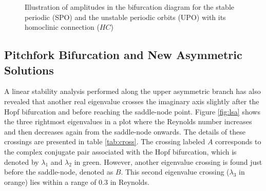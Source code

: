 \begin{figure}[h!]
\centering
{}
\caption{Illustration of amplitudes in the bifurcation diagram for the stable
  periodic (SPO) and the unstable periodic orbits (UPO) with its homoclinic
  connection ($HC$)} 
\label{fig:sub_hopf_sketch}
\end{figure}

\subsection{Pitchfork Bifurcation and New Asymmetric Solutions}

A linear stability analysis performed along the upper asymmetric branch has
also revealed that another real eigenvalue crosses the imaginary axis slightly
after the Hopf bifurcation and before reaching the saddle-node point. Figure
\ref{fig:lsa} shows the three rightmost eigenvalues in a plot where the
Reynolds number increases and then decreases again from the saddle-node
onwards. The details of these crossings are presented in table \ref{tab:cross}.
The crossing labeled $A$ corresponds to the complex conjugate pair associated
with the Hopf bifurcation, which is denoted by $\lambda_1$ and $\lambda_2$ in
green. However, another eigenvalue crossing is found just before the
saddle-node, denoted as $B$. This second eigenvalue crossing ($\lambda_3$ in
orange) lies within a range of $0.3$ in Reynolds. \\\\

